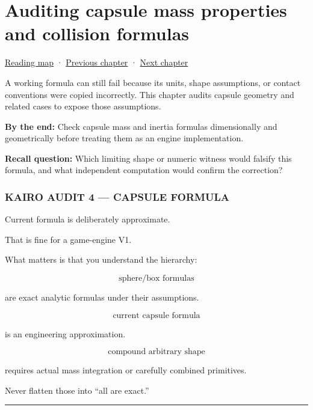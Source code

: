 \hypertarget{06-engine-ii-ch036}{}
\chapter{Auditing capsule mass properties and collision formulas}\label{06-engine-ii-ch036-auditing-capsule-mass-properties-and-collision-formulas}

\hyperref[volume-reading-map]{Reading map} · \hyperref[06-engine-ii-ch035-a-complete-rigid-body-state-before-the-formula-audit]{Previous chapter} · \hyperref[06-engine-ii-ch037-physical-examples-and-state-validation]{Next chapter}

A working formula can still fail because its units, shape assumptions, or contact conventions were copied incorrectly. This chapter audits capsule geometry and related cases to expose those assumptions.

\textbf{By the end:} Check capsule mass and inertia formulas dimensionally and geometrically before treating them as an engine implementation.

\textbf{Recall question:} Which limiting shape or numeric witness would falsify this formula, and what independent computation would confirm the correction?

\subsection{KAIRO AUDIT 4 --- CAPSULE FORMULA}\label{06-engine-ii-ch036-kairo-audit-4-capsule-formula}

Current formula is deliberately approximate.

That is fine for a game-engine V1.

What matters is that you understand the hierarchy:

\[
\text{sphere/box formulas}
\]

are exact analytic formulas under their assumptions.

\[
\text{current capsule formula}
\]

is an engineering approximation.

\[
\text{compound arbitrary shape}
\]

requires actual mass integration or carefully combined primitives.

Never flatten those into ``all are exact.''

\begin{center}\rule{0.5\linewidth}{0.5pt}\end{center}

